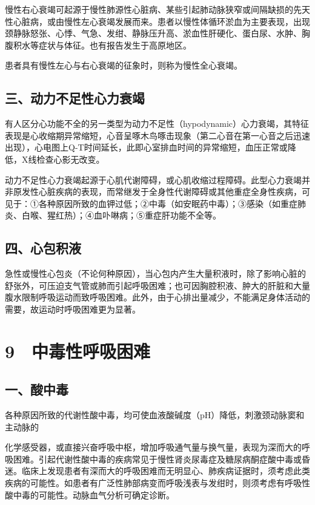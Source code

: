 慢性右心衰竭可起源于慢性肺源性心脏病、某些引起肺动脉狭窄或间隔缺损的先天性心脏病，或由慢性左心衰竭发展而来。患者以慢性体循环淤血为主要表现，出现颈静脉怒张、心悸、气急、发绀、静脉压升高、淤血性肝硬化、蛋白尿、水肿、胸腹积水等症状与体征。也有报告发生于高原地区。

患者具有慢性左心与右心衰竭的征象时，则称为慢性全心衰竭。

\subsection{三、动力不足性心力衰竭}

有人区分心功能不全的另一类型为动力不足性（hypodynamic）心力衰竭，其特征表现是心收缩期异常缩短，心音呈啄木鸟啄击现象（第二心音在第一心音之后迅速出现），心电图上Q-T时间延长，此即心室排血时间的异常缩短，血压正常或降低，X线检查心影无改变。

动力不足性心力衰竭起源于心肌代谢障碍，或心肌收缩过程障碍。此型心力衰竭并非原发性心脏疾病的表现，而常继发于全身性代谢障碍或其他重症全身性疾病，可见于：①各种原因所致的血钾过低；②中毒（如安眠药中毒）；③感染（如重症肺炎、白喉、猩红热）；④血卟啉病；⑤重症肝功能不全等。

\subsection{四、心包积液}

急性或慢性心包炎（不论何种原因），当心包内产生大量积液时，除了影响心脏的舒张外，可压迫支气管或肺而引起呼吸困难；也可因胸腔积液、肿大的肝脏和大量腹水限制呼吸运动而致呼吸困难。此外，由于心排出量减少，不能满足身体活动的需要，故运动时呼吸困难更为显著。

\protect\hypertarget{text00052.html}{}{}

\section{9　中毒性呼吸困难}

\subsection{一、酸中毒}

各种原因所致的代谢性酸中毒，均可使血液酸碱度（pH）降低，刺激颈动脉窦和主动脉的

化学感受器，或直接兴奋呼吸中枢，增加呼吸通气量与换气量，表现为深而大的呼吸困难。引起代谢性酸中毒的疾病常见于慢性肾炎尿毒症及糖尿病酮症酸中毒或昏迷。临床上发现患者有深而大的呼吸困难而无明显心、肺疾病证据时，须考虑此类疾病的可能性。如患者有广泛性肺部病变而呼吸浅表与发绀时，则须考虑有呼吸性酸中毒的可能性。动脉血气分析可确定诊断。

